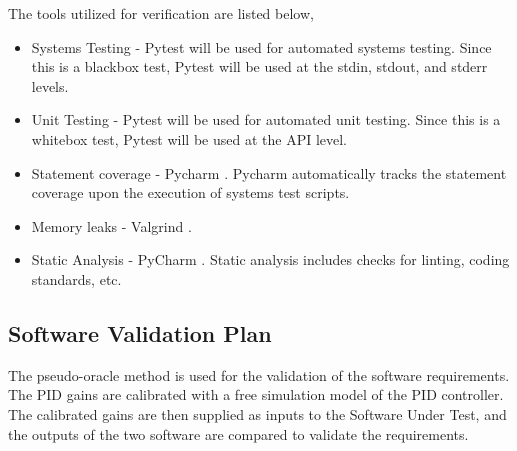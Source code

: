 \documentclass[12pt, titlepage]{article}
\begin{document}

The tools utilized for verification are listed below,

\begin{itemize}
\item Systems Testing - Pytest \cite{Pytest} will be used for automated systems
testing. Since this  is a blackbox test, Pytest will be used at the stdin, stdout, and
stderr levels.

\item Unit Testing - Pytest \cite{Pytest} will be used for automated unit testing.
 Since this is a whitebox test, Pytest will be used at the API level.

\item Statement coverage - Pycharm \cite{Pycharm}. Pycharm automatically tracks
 the statement coverage upon the execution of systems test scripts.

\item Memory leaks - Valgrind \cite{Valgrind}.

\item Static Analysis - PyCharm \cite{Pycharm}. Static analysis includes checks for linting,
coding standards, etc.

\end{itemize}

\subsection{Software Validation Plan}


The pseudo-oracle method is used for the validation of the software requirements.
The PID gains are calibrated with a free simulation model \cite{Free_PID} of the 
PID controller. The calibrated gains are then supplied as inputs to the Software 
Under Test, and the outputs of the two software are compared to validate 
the requirements.
\end{document}
